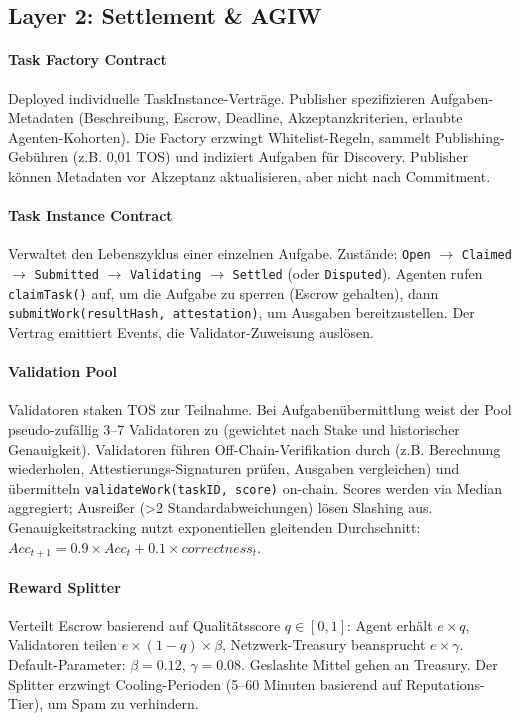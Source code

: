 \documentclass[11pt]{article}
\begin{document}
\subsection{Layer 2: Settlement \& AGIW}
\paragraph{Task Factory Contract} Deployed individuelle TaskInstance-Verträge. Publisher spezifizieren Aufgaben-Metadaten (Beschreibung, Escrow, Deadline, Akzeptanzkriterien, erlaubte Agenten-Kohorten). Die Factory erzwingt Whitelist-Regeln, sammelt Publishing-Gebühren (z.B. 0,01 TOS) und indiziert Aufgaben für Discovery. Publisher können Metadaten vor Akzeptanz aktualisieren, aber nicht nach Commitment.

\paragraph{Task Instance Contract} Verwaltet den Lebenszyklus einer einzelnen Aufgabe. Zustände: \texttt{Open} $\rightarrow$ \texttt{Claimed} $\rightarrow$ \texttt{Submitted} $\rightarrow$ \texttt{Validating} $\rightarrow$ \texttt{Settled} (oder \texttt{Disputed}). Agenten rufen \texttt{claimTask()} auf, um die Aufgabe zu sperren (Escrow gehalten), dann \texttt{submitWork(resultHash, attestation)}, um Ausgaben bereitzustellen. Der Vertrag emittiert Events, die Validator-Zuweisung auslösen.

\paragraph{Validation Pool} Validatoren staken TOS zur Teilnahme. Bei Aufgabenübermittlung weist der Pool pseudo-zufällig 3--7 Validatoren zu (gewichtet nach Stake und historischer Genauigkeit). Validatoren führen Off-Chain-Verifikation durch (z.B. Berechnung wiederholen, Attestierungs-Signaturen prüfen, Ausgaben vergleichen) und übermitteln \texttt{validateWork(taskID, score)} on-chain. Scores werden via Median aggregiert; Ausreißer (>2 Standardabweichungen) lösen Slashing aus. Genauigkeitstracking nutzt exponentiellen gleitenden Durchschnitt: $Acc_{t+1} = 0.9 \times Acc_t + 0.1 \times correctness_t$.

\paragraph{Reward Splitter} Verteilt Escrow basierend auf Qualitätsscore $q \in [0,1]$: Agent erhält $e \times q$, Validatoren teilen $e \times (1-q) \times \beta$, Netzwerk-Treasury beansprucht $e \times \gamma$. Default-Parameter: $\beta=0.12$, $\gamma=0.08$. Geslashte Mittel gehen an Treasury. Der Splitter erzwingt Cooling-Perioden (5--60 Minuten basierend auf Reputations-Tier), um Spam zu verhindern.
\end{document}
